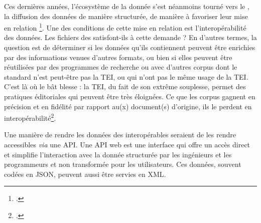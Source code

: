 Ces dernières années, l'écosystème de la donnée s'est néanmoins tourné vers le \linkeddata, \cad{} la diffusion des données \og de manière structurée, de manière à favoriser leur mise en relation \fg\footcite[p. 66]{jolivet}. Une des conditions de cette mise en relation est l'interopérabilité des données. Les fichiers des \odm{} satisfont-ils à cette demande ? En d'autres termes, la question est de déterminer si les données qu'ils contiennent peuvent être enrichies par des informations venues d'autres formats, ou bien si elles peuvent être réutilisées par des programmes de recherche ou avec d'autres corpus dont le standard n'est peut-être pas la TEI, ou qui n'ont pas le même usage de la TEI. C'est là où le bât blesse : la TEI, du fait de son extrême souplesse, permet des pratiques éditoriales qui peuvent être très éloignées. Ce que les corpus gagnent en précision et en fidélité par rapport au(x) document(s) d'origine, ils le perdent en interopérabilité\footcite[p. 61-62]{jolivet}.

Une manière de rendre les données des \odm{} interopérables seraient de les rendre accessibles \textit{via} une API. Une API web est une interface qui offre un accès direct et simplifie l'interaction avec la donnée structurée par les ingénieurs et les programmeurs et non transformée pour les utilisateurs. Ces données, souvent codées en JSON, peuvent aussi être servies en XML.